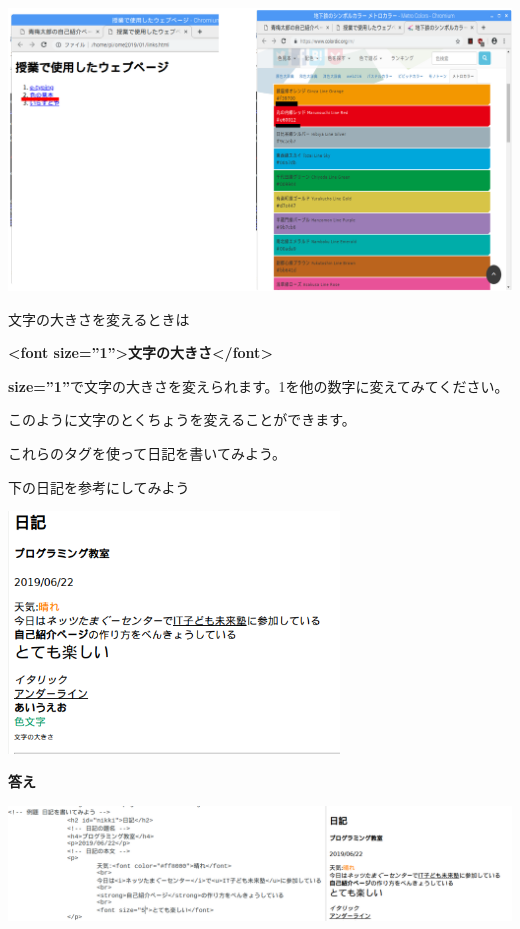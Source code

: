 \documentclass[a4paper,12pt]{jarticle}
\begin{document}
\bigskip

\includegraphics[width=\textwidth]{textbook-img187.png}

文字の大きさを変えるときは

\textbf{{\textless}font size=”1”{\textgreater}文字の大きさ{\textless}/font{\textgreater}}

\textbf{size=”1”}で文字の大きさを変えられます。1を他の数字に変えてみてください。

このように文字のとくちょうを変えることができます。


\bigskip

これらのタグを使って日記を書いてみよう。

下の日記を参考にしてみよう


\bigskip

\includegraphics[width=8.779cm]{textbook-img185.png}

\clearpage
\textbf{答え}



\includegraphics[width=\textwidth]{textbook-img188.png}
\end{document}
